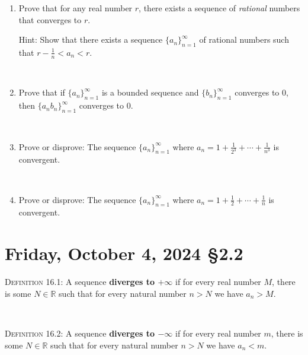 \documentclass[12pt]{amsart}
\def\Fr{Friday}
\newcommand{\R}{{\mathbb{R}}}
\numberwithin{equation}{section}
\theoremstyle{plain} %
\newcommand{\Oct}[3]{\section{#2, October #1, 2024 \quad \S#3}}
\theoremstyle{definition}
\theoremstyle{remark}
\begin{document}
\begin{enumerate}
\

\item Prove that for any real number $r$, there exists a sequence of \emph{rational} numbers that converges to $r$.

Hint: Show that there exists a sequence $\{a_n\}_{n=1}^\infty$ of rational numbers such that ${r- \frac{1}{n} < a_n < r}$.

\


\item Prove that if $\{a_n\}_{n=1}^\infty$ is a bounded sequence and $\{b_n\}_{n=1}^\infty$ converges to $0$, then $\{a_n b_n\}_{n=1}^\infty$ converges to $0$.

\



\item Prove or disprove: The sequence $\{a_n\}_{n=1}^\infty$ where $a_n = 1 + \frac{1}{2^3} + \cdots + \frac{1}{n^3}$ is convergent.

\

\item Prove or disprove: The sequence $\{a_n\}_{n=1}^\infty$ where $a_n = 1 + \frac{1}{2} + \cdots + \frac{1}{n}$ is convergent.



\end{enumerate}







\newpage

\Oct{4}{\Fr}{2.2}

\begin{framed}
\noindent \textsc{Definition 16.1:} A sequence \textbf{diverges to $+\infty$} if for every real number $M$, there is some $N\in \R$ such that for every natural number $n>N$ we have $a_n > M$.

\


\noindent \textsc{Definition 16.2:} A sequence \textbf{diverges to $-\infty$} if for every real number $m$, there is some $N\in \R$ such that for every natural number $n>N$ we have $a_n < m$.
\end{framed}
\end{document}

